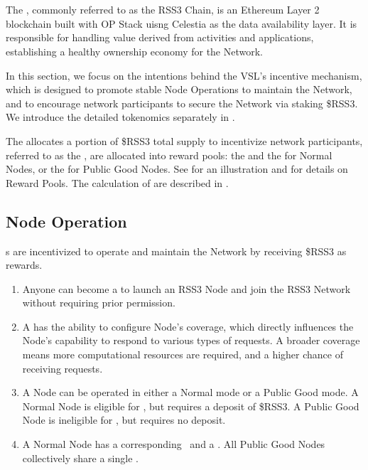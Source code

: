 \section{}
\label{sec:VSL}

The , commonly referred to as the RSS3 Chain, is an Ethereum Layer 2 blockchain built with OP Stack uisng Celestia as the data availability layer.
It is responsible for handling value derived from  activities and applications, establishing a healthy ownership economy for the Network.

In this section, we focus on the intentions behind the \gls{VSL}'s incentive mechanism, which is designed to promote stable Node Operations to maintain the Network, and to encourage network participants to secure the Network via staking \$RSS3.
We introduce the detailed tokenomics separately in .

The  allocates a portion of \$RSS3 total supply to incentivize network participants, referred to as the ,
are allocated into reward pools: the  and the  for Normal Nodes, or the  for Public Good Nodes.
See  for an illustration and  for details on Reward Pools.
The calculation of  are described in .

\subsection{Node Operation}
s are incentivized to operate and maintain the Network by receiving \$RSS3 as rewards.
\begin{enumerate}
    \item Anyone can become a  to launch an RSS3 Node and join the RSS3 Network without requiring prior permission.
    \item A  has the ability to configure Node's coverage, which directly influences the Node's capability to respond to various types of requests. A broader coverage means more computational resources are required, and a higher chance of receiving requests.
    \item A Node can be operated in either a Normal mode or a Public Good mode. A Normal Node is eligible for , but requires a deposit of \$RSS3. A Public Good Node is ineligible for , but requires no deposit.
    \item A Normal Node has a corresponding \operationPool\ and a \stakingPool. All Public Good Nodes collectively share a single \publicGoodPool.
\end{enumerate}

